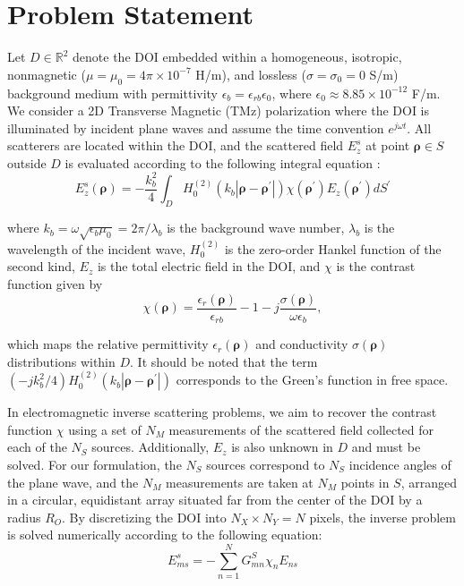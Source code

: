 \documentclass{ieeeaccess}
\newcommand{\brho}{\boldsymbol{\rho}}
\newcommand{\brhop}{\boldsymbol{\rho^\prime}}
\begin{document}
\section{Problem Statement}\label{sec:problemstatement}
    
    Let $D \in \mathbb{R}^2$ denote the DOI embedded within a homogeneous, isotropic, nonmagnetic ($\mu = \mu_0 = 4\pi \times 10^{-7}$ H/m), and lossless ($\sigma = \sigma_0 = 0$ S/m) background medium with permittivity $\epsilon_b = \epsilon_{rb}\epsilon_0$, where $\epsilon_0 \approx 8.85 \times 10^{-12}$ F/m. We consider a 2D Transverse Magnetic (TMz) polarization where the DOI is illuminated by incident plane waves and assume the time convention $e^{j\omega t}$. All scatterers are located within the DOI, and the scattered field $E^s_z$ at point $\brho \in S$ outside $D$ is evaluated according to the following integral equation \cite{harrington2001time}:
    \begin{equation}
        E^s_z (\brho) = -\frac{k_b^2}{4} \int_D H_0^{(2)}(k_b|\brho-\brhop|)\chi(\brhop)E_z(\brhop) dS^\prime
    \end{equation}
    
    \noindent where $k_b = \omega\sqrt{\epsilon_b\mu_0} = 2\pi/\lambda_b$ is the background wave number, $\lambda_b$ is the wavelength of the incident wave, $H_0^{(2)}$ is the zero-order Hankel function of the second kind, $E_z$ is the total electric field in the DOI, and $\chi$ is the contrast function given by
    \begin{equation}
        \chi(\brho) = \frac{\epsilon_r(\brho)}{\epsilon_{rb}} - 1 - j\frac{\sigma(\brho)}{\omega\epsilon_b},
    \end{equation}
    
    \noindent which maps the relative permittivity $\epsilon_r(\brho)$ and conductivity $\sigma(\brho)$ distributions within $D$. It should be noted that the term $(-jk_b^2/4) H_0^{(2)}(k_b|\brho-\brhop|)$ corresponds to the Green's function in free space.
    
    In electromagnetic inverse scattering problems, we aim to recover the contrast function $\chi$ using a set of $N_M$ measurements of the scattered field collected for each of the $N_S$ sources. Additionally, $E_z$ is also unknown in $D$ and must be solved. For our formulation, the $N_S$ sources correspond to $N_S$ incidence angles of the plane wave, and the $N_M$ measurements are taken at $N_M$ points in $S$, arranged in a circular, equidistant array situated far from the center of the DOI by a radius $R_O$. By discretizing the DOI into $N_X \times N_Y = N$ pixels, the inverse problem is solved numerically according to the following equation:
    \begin{equation}
        E^s_{ms} = - \sum\limits_{n=1}^{N} G^S_{mn}\chi_{n}E_{ns} \label{eq:numerical}
    \end{equation}
    
\end{document}
